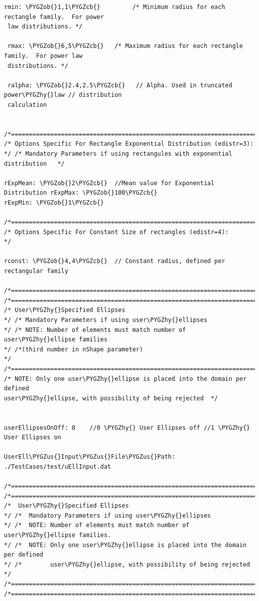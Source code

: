 \documentclass[letterpaper,10pt,english]{sphinxmanual}
\def\PYGZus{\char`\_}
\def\PYGZob{\char`\{}
\def\PYGZcb{\char`\}}
\def\PYGZhy{\char`\-}
\begin{document}
\begin{Verbatim}[commandchars=\\\{\}]
 rmin: \PYGZob{}1,1\PYGZcb{}         /* Minimum radius for each rectangle family.  For power
 law distributions. */

 rmax: \PYGZob{}6,5\PYGZcb{}   /* Maximum radius for each rectangle family.  For power law
 distributions. */

 ralpha: \PYGZob{}2.4,2.5\PYGZcb{}   // Alpha. Used in truncated power\PYGZhy{}law // distribution
 calculation


/*===========================================================================*/
/* Options Specific For Rectangle Exponential Distribution (edistr=3):
*/ /* Mandatory Parameters if using rectangules with exponential
distribution   */

rExpMean: \PYGZob{}2\PYGZcb{}  //Mean value for Exponential  Distribution rExpMax: \PYGZob{}100\PYGZcb{}
rExpMin: \PYGZob{}1\PYGZcb{}

/*===========================================================================*/
/* Options Specific For Constant Size of rectangles (edistr=4):
*/

rconst: \PYGZob{}4,4\PYGZcb{}  // Constant radius, defined per rectangular family

/*===========================================================================*/
/*===========================================================================*/
/* User\PYGZhy{}Specified Ellipses
*/ /* Mandatory Parameters if using user\PYGZhy{}ellipses
*/ /* NOTE: Number of elements must match number of user\PYGZhy{}ellipse families
*/ /*(third number in nShape parameter)
*/
/*===========================================================================*/
/* NOTE: Only one user\PYGZhy{}ellipse is placed into the domain per defined
user\PYGZhy{}ellipse, with possibility of being rejected  */


userEllipsesOnOff: 0    //0 \PYGZhy{} User Ellipses off //1 \PYGZhy{} User Ellipses on

UserEll\PYGZus{}Input\PYGZus{}File\PYGZus{}Path: ./TestCases/test/uEllInput.dat

/*===========================================================================*/
/*===========================================================================*/
/*  User\PYGZhy{}Specified Ellipses
*/ /*  Mandatory Parameters if using user\PYGZhy{}ellipses
*/ /*  NOTE: Number of elements must match number of user\PYGZhy{}ellipse families.
*/ /*  NOTE: Only one user\PYGZhy{}ellipse is placed into the domain per defined
*/ /*        user\PYGZhy{}ellipse, with possibility of being rejected
*/
/*===========================================================================*/
/*===========================================================================*/


\end{Verbatim}
\end{document}

